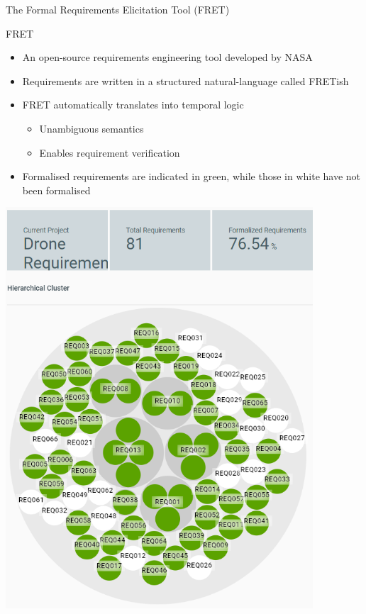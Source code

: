 \documentclass[11pt, aspectratio=169, table]{beamer}
\begin{document}
\begin{frame}{The Formal Requirements Elicitation Tool (FRET)}
\begin{minipage}{0.55\textwidth}
	\begin{block}{FRET}
		\begin{itemize}
			\item An open-source requirements engineering tool developed by NASA
			
			\item Requirements are written in a structured natural-language called FRETish
			
			\item FRET automatically translates \fretish into temporal logic
			\begin{itemize}
				\item Unambiguous semantics
				\item Enables requirement verification
			\end{itemize}			
			

                \item Formalised requirements are indicated in green, while those in white have not been formalised

		\end{itemize}
	\end{block}
\end{minipage}\noindent
\begin{minipage}{0.43\textwidth}
	\centering
	\includegraphics[width=0.86\textwidth]{images/drone-reqs-circle-diagram-no-legend.png}
\end{minipage}
\end{frame}
\end{document}
